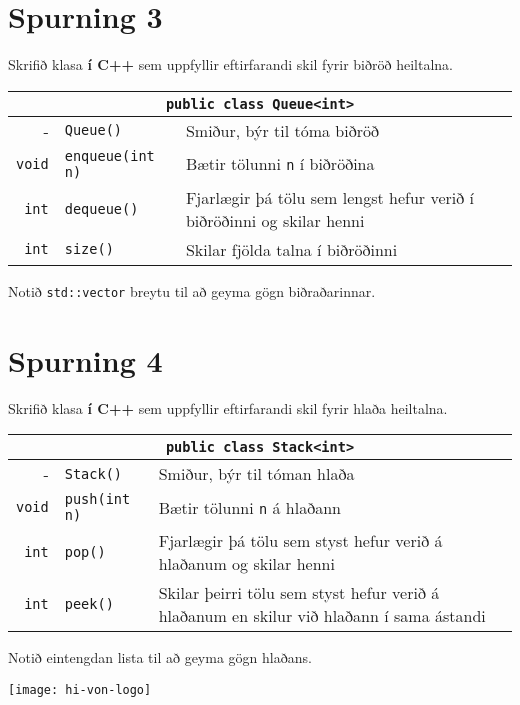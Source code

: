 \documentclass{article}
\begin{document}
\newpage

\section{Spurning 3}
Skrifið klasa \textbf{í C++} sem uppfyllir eftirfarandi skil fyrir biðröð heiltalna. 

\begin{center}
\begin{tabularx}{\textwidth}{rlX}
\toprule
\multicolumn{3}{c}{\texttt{public class Queue<int>}}\\
\midrule
-&\texttt{Queue()}& Smiður, býr til tóma biðröð\\
\texttt{void}&\texttt{enqueue(int n)}&Bætir tölunni \texttt{n} í biðröðina\\
\texttt{int}&\texttt{dequeue()}&Fjarlægir þá tölu sem lengst hefur verið í biðröðinni og skilar henni\\
\texttt{int}&\texttt{size()}&Skilar fjölda talna í biðröðinni\\
\bottomrule
\end{tabularx}
\end{center}

Notið \texttt{std::vector} breytu til að geyma gögn biðraðarinnar.

\section{Spurning 4}
Skrifið klasa \textbf{í C++} sem uppfyllir eftirfarandi skil fyrir hlaða heiltalna. 

\begin{center}
\begin{tabularx}{\textwidth}{rlX}
\toprule
\multicolumn{3}{c}{\texttt{public class Stack<int>}}\\
\midrule
-&\texttt{Stack()}& Smiður, býr til tóman hlaða\\
\texttt{void}&\texttt{push(int n)}&Bætir tölunni \texttt{n} á hlaðann\\
\texttt{int}&\texttt{pop()}&Fjarlægir þá tölu sem styst hefur verið á hlaðanum og skilar henni\\
\texttt{int}&\texttt{peek()}&Skilar þeirri tölu sem styst hefur verið á hlaðanum en skilur við hlaðann í sama ástandi\\
\bottomrule
\end{tabularx}
\end{center}

Notið eintengdan lista til að geyma gögn hlaðans.

\vfill
\texttt{[image: hi-von-logo]}
\end{document}
